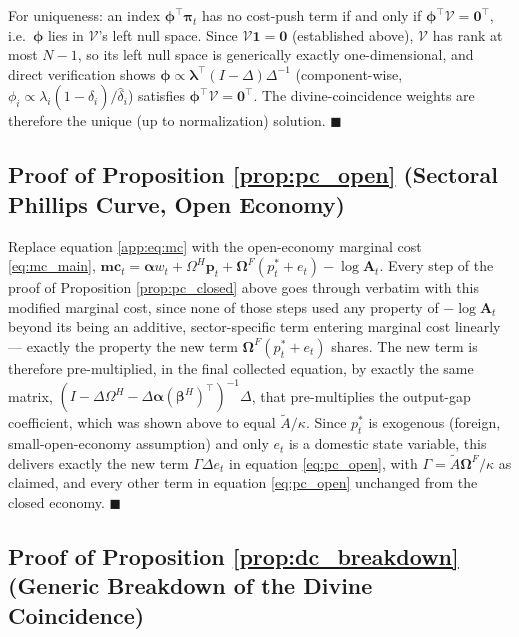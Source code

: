 \documentclass[12pt]{article}
\begin{document}
For uniqueness: an index $\bm\phi^\top\bm\pi_t$ has no cost-push term if and only if
$\bm\phi^\top\mathcal V=\mathbf 0^\top$, i.e.\ $\bm\phi$ lies in $\mathcal V$'s left null space. Since
$\mathcal V\mathbf 1=\mathbf 0$ (established above), $\mathcal V$ has rank at most $N-1$, so its left
null space is generically exactly one-dimensional, and direct verification shows
$\bm\phi\propto\bm\lambda^\top(I-\Delta)\Delta^{-1}$ (component-wise, $\phi_i\propto
\lambda_i(1-\hat\delta_i)/\hat\delta_i$) satisfies $\bm\phi^\top\mathcal V=\mathbf 0^\top$. The
divine-coincidence weights are therefore the unique (up to normalization) solution. $\blacksquare$

\subsection{Proof of Proposition \ref{prop:pc_open} (Sectoral Phillips Curve, Open Economy)}
\label{app:open_economy_proofs}

Replace equation \eqref{app:eq:mc} with the open-economy marginal cost \eqref{eq:mc_main},
$\bm{mc}_t=\bm\alpha w_t+\Omega^H\bm p_t+\bm\Omega^F(p_t^*+e_t)-\log\mathbf A_t$. Every step of the
proof of Proposition \ref{prop:pc_closed} above goes through verbatim with this modified marginal
cost, since none of those steps used any property of $-\log\mathbf A_t$ beyond its being an additive,
sector-specific term entering marginal cost linearly --- exactly the property the new term
$\bm\Omega^F(p_t^*+e_t)$ shares. The new term is therefore pre-multiplied, in the final collected
equation, by exactly the same matrix, $(I-\Delta\Omega^H-\Delta\bm\alpha(\bm\beta^H)^\top)^{-1}\Delta$,
that pre-multiplies the output-gap coefficient, which was shown above to equal $\tilde A/\kappa$.
Since $p_t^*$ is exogenous (foreign, small-open-economy assumption) and only $e_t$ is a domestic
state variable, this delivers exactly the new term $\Gamma\Delta e_t$ in equation \eqref{eq:pc_open},
with $\Gamma=\tilde A\bm\Omega^F/\kappa$ as claimed, and every other term in equation
\eqref{eq:pc_open} unchanged from the closed economy. $\blacksquare$

\subsection{Proof of Proposition \ref{prop:dc_breakdown} (Generic Breakdown of the Divine Coincidence)}
\end{document}
